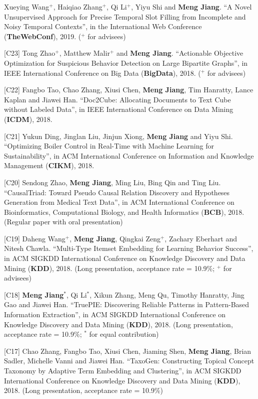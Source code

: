 \documentclass[margin, 9pt]{res}
\begin{document}
\begin{resume}
[C24] Xueying Wang${}^{+}$, Haiqiao Zhang${}^{+}$, Qi Li${}^{+}$, Yiyu Shi and \textbf{Meng Jiang}. ``A Novel Unsupervised Approach for Precise Temporal Slot Filling from Incomplete and Noisy Temporal Contexts'', in the International Web Conference (\textbf{TheWebConf}), 2019. (${}^{+}$ for advisees)

[C23] Tong Zhao${}^{+}$, Matthew Malir${}^{+}$ and \textbf{Meng Jiang}. ``Actionable Objective Optimization for Suspicious Behavior Detection on Large Bipartite Graphs'', in IEEE International Conference on Big Data (\textbf{BigData}), 2018. (${}^{+}$ for advisees)

[C22] Fangbo Tao, Chao Zhang, Xiusi Chen, \textbf{Meng Jiang}, Tim Hanratty, Lance Kaplan and Jiawei Han. ``Doc2Cube: Allocating Documents to Text Cube without Labeled Data'', in IEEE International Conference on Data Mining (\textbf{ICDM}), 2018.

[C21] Yukun Ding, Jinglan Liu, Jinjun Xiong, \textbf{Meng Jiang} and Yiyu Shi. ``Optimizing Boiler Control in Real-Time with Machine Learning for Sustainability'', in ACM International Conference on Information and Knowledge Management (\textbf{CIKM}), 2018.

[C20] Sendong Zhao, \textbf{Meng Jiang}, Ming Liu, Bing Qin and Ting Liu. ``CausalTriad: Toward Pseudo Causal Relation Discovery and Hypotheses Generation from Medical Text Data'', in ACM International Conference on Bioinformatics, Computational Biology, and Health Informatics (\textbf{BCB}), 2018. (Regular paper with oral presentation)

[C19] Daheng Wang${}^{+}$, \textbf{Meng Jiang}, Qingkai Zeng${}^{+}$, Zachary Eberhart and Nitesh Chawla. ``Multi-Type Itemset Embedding for Learning Behavior Success'', in ACM SIGKDD International Conference on Knowledge Discovery and Data Mining (\textbf{KDD}), 2018. (Long presentation, acceptance rate = 10.9\%; ${}^{+}$ for advisees)

[C18] \textbf{Meng Jiang}${}^{*}$, Qi Li${}^{*}$, Xikun Zhang, Meng Qu, Timothy Hanratty, Jing Gao and Jiawei Han. ``TruePIE: Discovering Reliable Patterns in Pattern-Based Information Extraction'', in ACM SIGKDD International Conference on Knowledge Discovery and Data Mining (\textbf{KDD}), 2018. (Long presentation, acceptance rate = 10.9\%; ${}^{*}$ for equal contribution)

[C17] Chao Zhang, Fangbo Tao, Xiusi Chen, Jiaming Shen, \textbf{Meng Jiang}, Brian Sadler, Michelle Vanni and Jiawei Han. ``TaxoGen: Constructing Topical Concept Taxonomy by Adaptive Term Embedding and Clustering'', in ACM SIGKDD International Conference on Knowledge Discovery and Data Mining (\textbf{KDD}), 2018. (Long presentation, acceptance rate = 10.9\%)


\end{resume}
\end{document}
